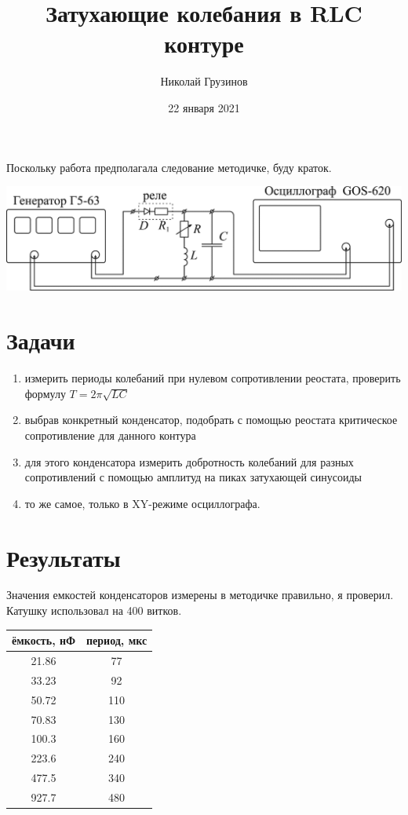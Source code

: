 \documentclass[a4paper, 12pt]{article}
\title{Затухающие колебания в RLC контуре}
\author{Николай Грузинов}
\date{22 января 2021}
\begin{document}
\maketitle

Поскольку работа предполагала следование методичке, буду краток.
\begin{center}
\includegraphics[width=0.7\linewidth]{curcuit.png}
\end{center}

\section{Задачи}
\begin{enumerate}
\item измерить периоды колебаний при нулевом сопротивлении реостата, проверить формулу $T = 2 \pi \sqrt{LC}$
\item выбрав конкретный конденсатор, подобрать с помощью реостата критическое сопротивление для данного контура
\item для этого конденсатора измерить добротность колебаний для разных сопротивлений с помощью амплитуд на пиках затухающей синусоиды
\item то же самое, только в XY-режиме осциллографа.
\end{enumerate}

\section{Результаты}
Значения емкостей конденсаторов измерены в методичке правильно, я проверил.
Катушку использовал на 400 витков.

\begin{tabular}{|c|c|}        \hline
ёмкость, нФ & период, мкс  \\ \hline
21.86       & 77           \\ \hline
33.23       & 92           \\ \hline
50.72       & 110          \\ \hline
70.83       & 130          \\ \hline
100.3       & 160          \\ \hline
223.6       & 240          \\ \hline
477.5       & 340          \\ \hline
927.7       & 480          \\ \hline
\end{tabular}
\end{document}
